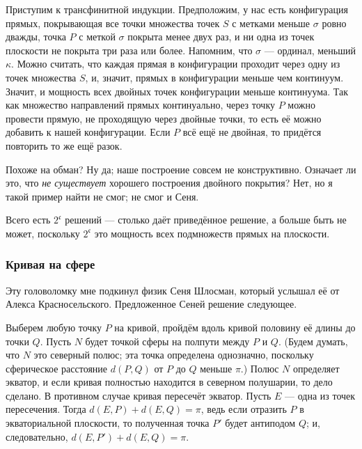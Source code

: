 Приступим к трансфинитной индукции.
Предположим, у нас есть конфигурация прямых, покрывающая все точки множества точек $S$ с метками меньше $\sigma$ ровно дважды,
точка $P$ с меткой $\sigma$ покрыта менее двух раз,
и ни одна из точек плоскости не покрыта три раза или более.
Напомним, что $\sigma$ --- ординал, меньший $\kappa$.
Можно считать, что каждая прямая в конфигурации проходит через одну из точек множества $S$, и, значит, прямых в конфигурации меньше чем континуум.
Значит, и мощность всех двойных точек конфигурации меньше континуума.
Так как множество направлений прямых континуально, через точку $P$ можно провести прямую, не проходящую через двойные точки,
то есть её можно добавить к нашей конфигурации.
Если $P$ всё ещё не двойная, то придётся повторить то же ещё разок.

Похоже на обман?
Ну да; наше построение совсем не конструктивно.
Означает ли это, что \emph{не существует} хорошего построения двойного покрытия?
Нет, но я такой пример найти не смог; не смог и Сеня.

\begin{addedbytheeditors}
Всего есть $2^{\mathfrak{c}}$ решений --- столько даёт приведённое решение, а больше быть не может, поскольку $2^{\mathfrak{c}}$ это мощность всех подмножеств прямых на плоскости.\pr
\end{addedbytheeditors}


\subsubsection*{Кривая на сфере}

Эту головоломку мне подкинул физик Сеня Шлосман, который услышал её от Алекса Красносельского.
Предложенное Сеней решение следующее.

Выберем любую точку $P$ на кривой, пройдём вдоль кривой половину её длины до точки $Q$.
Пусть $N$ будет точкой сферы на полпути между $P$ и $Q$.
(Будем думать, что $N$ это северный полюс; эта точка определена однозначно, поскольку сферическое расстояние $d(P, Q)$ от $P$ до $Q$ меньше $\pi$.)
Полюс $N$ определяет экватор, и если кривая полностью находится в северном полушарии, то дело сделано.
В противном случае кривая пересечёт экватор.
Пусть $E$ --- одна из точек пересечения.
Тогда $d(E,P) + d(E,Q) = \pi$, ведь если отразить $P$ в экваториальной плоскости, то полученная точка $P'$ будет антиподом $Q$; и, следовательно, $d(E, P') + d(E, Q) = \pi$.


